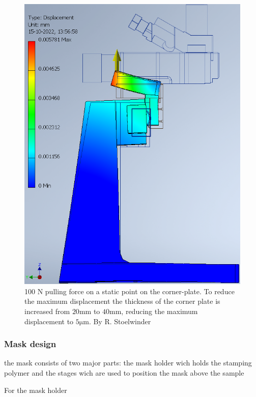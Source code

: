 \documentclass[11pt]{article}
\begin{document}
\begin{figure}[H]
\begin{minipage}[b]{0.45\textwidth}
    \includegraphics[width=1\textwidth]{img/rigidity_simulation/study_10.png}
    \caption{100 N pulling force on a static point on the corner-plate. To reduce the maximum displacement the thickness of the corner plate is increased from  $20\mathrm{mm}$ to $40\mathrm{mm}$, reducing the maximum displacement to $5\mathrm{\mu m}$. By R. Stoelwinder }
    \label{fig:disp_study10}
  \end{minipage}
\end{figure}

\subsubsection{Mask design}
the mask consists of two major parts: the mask holder wich holds the stamping polymer and the stages wich are used to position the mask above the sample

For the mask holder 
\end{document}
